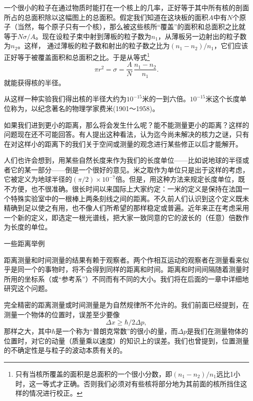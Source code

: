 \documentclass[12pt,oneside]{book}
\begin{document}
一个很小的粒子在通过物质时能打在一个核上的几率，正好等于其中所有核的剖面所占的总面积除以这幅图上的总面积。假定我们知道在这块板的面积$A$中有$N$个原子（当然，每个原子只有一个核），那么被这些核所“覆盖”的面积和总面积之比就等于$N \sigma / A$。现在设粒子束中射到薄板的粒子数为$n_1$，从薄板另一边射出的粒子数为$n_2$。这样， 通过薄板的粒子数和射出的粒子数之比为$(n_1-n_2)/n_1$，它们应该正好等于被覆盖面积和总面积之比。于是从等式\footnote{只有当核所覆盖的面积是总面积的一个很小分数，即$(n_1-n_2)/n_1$远比1小时，这一等式才正确。否则我们必须对有些核将部分地为其前面的核所挡住这样的情况进行校正。}
\begin{equation*}
\pi r^2=\sigma=\frac{A}{N}\,
\frac{n_1-n_2}{n_1}.
\end{equation*}
就能获得核的半径。

从这样一种实验我们得出核的半径大约为$10^{-15}$米的一到六倍。$10^{-15}$米这个长度单位称为，以纪念著名的物理学家费米(1901～1958)。

如果我们进到更小的距离，那么将会发生什么呢？能不能测量更小的距离？这样的问题现在还不可能回答。有人提出这种看法，认为迄今尚未解决的核力之谜，只有在对这样小的距离下的我们关于空间或测量的观念进行某些修正以后才能解开。

人们也许会想到，用某些自然长度来作为我们的长度单位——比如说地球的半径或者它的某一部分——倒是一个很好的意见。米之取作为单位只是出于这样的考虑，它被定义为地球半径的$(\pi/2)\times10^{-7}$倍。但是，用这种方法来规定长度单位，既不方便，也不很准确。很长时间以来国际上大家约定：一米的定义是保持在法国一个特殊实验室中的一根棒上两条刻线之间的距离。不久前人们认识到这个定义既未精确到足以使之有用，也不像人们所希望的那样稳定或普遍。近年来正在考虑采用一个新的定义，即选定一根光谱线，把大家一致同意的它的波长的（任意）倍数作为长度的单位。


\begin{fig}{一些距离举例}
\caption{一些距离举例}
\label{fig:一些距离举例}
\end{fig}

\noindent\dotfill

距离测量和时间测量的结果有赖于观察者。两个作相互运动的观察者在测量看来似乎是同一个的事物时，将不会得到同样的距离和时间。距离和时间间隔随着测量时所用的坐标系（或“参考系”）不同而有不同的大小。我们将在后面的一章中详细地研究这个问题。

完全精密的距离测量或时间测量是为自然规律所不允许的。我们前面已经提到，在测量一个物体的位置时，误差至少要像
\begin{equation*}
\Delta x\geq\hbar/2\Delta p,
\end{equation*}
那样之大，其中$\hbar$是一个称为“普朗克常数”的很小的量，而$\Delta p$是我们在测量物体的位置时，对它的动量（质量乘以速度）的知识上的误差。我们也曾提到，位置测量的不确定性是与粒子的波动本质有关的。
\end{document}
